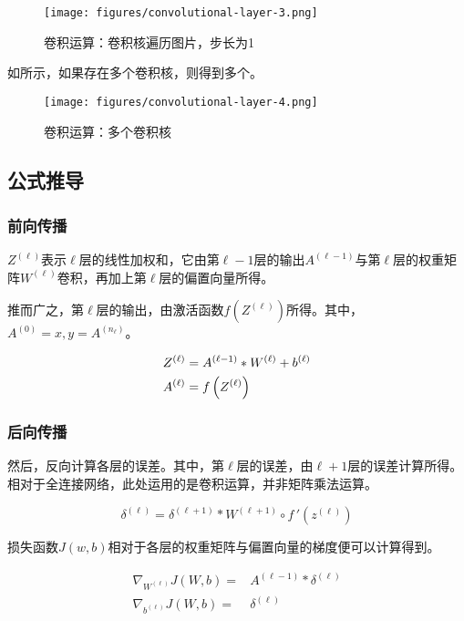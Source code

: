 \begin{content}
\begin{figure}[H]
\centering
\texttt{[image: figures/convolutional-layer-3.png]}
\caption{卷积运算：卷积核遍历图片，步长为1}
 \label{fig:mnist-conv-ndot}
\end{figure}

如所示，如果存在多个卷积核，则得到多个。

\begin{figure}[H]
\centering
\texttt{[image: figures/convolutional-layer-4.png]}
\caption{卷积运算：多个卷积核}
 \label{fig:mnist-conv-multi-filters}
\end{figure}

\subsection{公式推导}

\subsubsection{前向传播}

$Z^{(\ell )}$表示$\ell$层的线性加权和，它由第$\ell - 1$层的输出$A^{(\ell  - 1)}$与第$\ell$层的权重矩阵$W^{(\ell )}$卷积，再加上第$\ell$层的偏置向量所得。

推而广之，第$\ell$层的输出，由激活函数$f({Z^{(\ell )}})$所得。其中，$A^{(0)} = x, y = {A^{({n_\ell })}}$。

\[\begin{gathered}
  {Z^{(\ell )}} = {A^{(\ell  - 1)}} * {W^{(\ell )}} + {b^{(\ell )}} \hfill \\
  {A^{(\ell )}} = f\left( {{Z^{(\ell )}}} \right) \hfill \\ 
\end{gathered} \]

\subsubsection{后向传播}

然后，反向计算各层的误差。其中，第$\ell$层的误差，由$\ell + 1$层的误差计算所得。相对于全连接网络，此处运用的是卷积运算，并非矩阵乘法运算。

\[
{\delta ^{(\ell )}} = {\delta ^{(\ell  + 1)}} * {W^{(\ell  + 1)}} \circ f\,'\left( {{z^{(\ell )}}} \right)
\]

损失函数$J(w,b)$相对于各层的权重矩阵与偏置向量的梯度便可以计算得到。

\[\begin{aligned}
  {\nabla _{{W^{(\ell )}}}}J(W,b) =  & {A^{(\ell  - 1)}} * {\delta ^{(\ell )}} \\ 
  {\nabla _{{b^{(\ell )}}}}J(W,b) =  & {\delta ^{(\ell )}} \\ 
\end{aligned} \]


\end{content}
